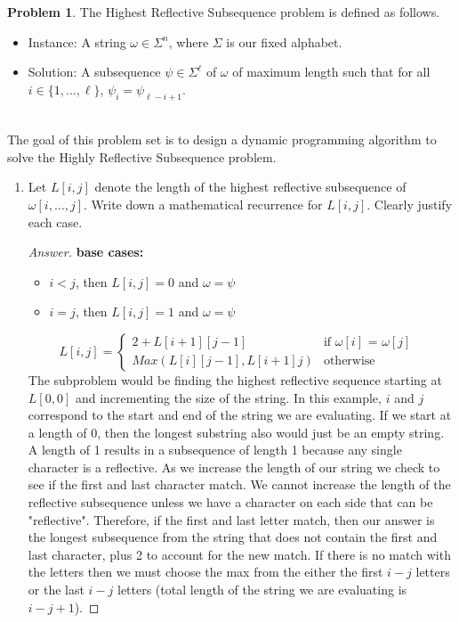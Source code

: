 \documentclass[11pt]{article}
\theoremstyle{definition}
\theoremstyle{definition}
\newtheorem{required}{Problem}
\theoremstyle{definition}
\begin{document}
\begin{required}
The \textsf{Highest Reflective Subsequence} problem is defined as follows.
\begin{itemize}
\item \textsf{Instance:} A string $\omega \in \Sigma^{n}$, where $\Sigma$ is our fixed alphabet.
\item \textsf{Solution:} A subsequence $\psi \in \Sigma^{\ell}$ of $\omega$ of maximum length such that for all $i \in \{1, \ldots, \ell\}$, $\psi_{i} = \psi_{\ell - i + 1}$.
\end{itemize}


\noindent \\ The goal of this problem set is to design a dynamic programming algorithm to solve the \textsf{Highly Reflective Subsequence} problem.

\begin{enumerate}[label=(\alph*)]
\subsection{Problem 2\ref{2a}}
\item \label{2a} Let $L[i, j]$ denote the length of the highest reflective subsequence of $\omega[i, \ldots, j]$. Write down a mathematical recurrence for $L[i, j]$. Clearly justify each case.

\begin{proof}[Answer]
\textbf{base cases:}
\begin{itemize}
    \item $i<j$, then $L[i, j]=0$ and $\omega = \psi$
    \item $i=j$, then $L[i, j]=1$ and $\omega = \psi$
\end{itemize}
\begin{equation}
  L[i, j]=\begin{cases}
    2 + L[i+1][j-1] & \text{if $\omega[i]$ = $\omega[j]$ }\\
    Max(L[i][j-1], L[i+1]j) & \text{otherwise}
  \end{cases}
\end{equation}
The subproblem  would be finding the highest reflective sequence starting at $L[0,0]$ and incrementing the size of the string. In this example, $i$ and $j$ correspond to the start and end of the string we are evaluating. If we start at a length of 0, then the longest substring also would just be an empty string. A length of 1 results in a subsequence of length 1 because any single character is a reflective. As we increase the length of our string we check to see if the first and last character match. We cannot increase the length of the reflective subsequence unless we have a character on each side that can be "reflective". Therefore, if the first and last letter match, then our answer is the longest subsequence from the string that does not contain the first and last character, plus 2 to account for the new match. If there is no match with the letters then we must choose the max from the either the first $i-j$ letters or the last $i-j$ letters (total length of the string we are evaluating is $i-j+1$). 
\end{proof}




\end{enumerate}
\end{required}
\end{document}
